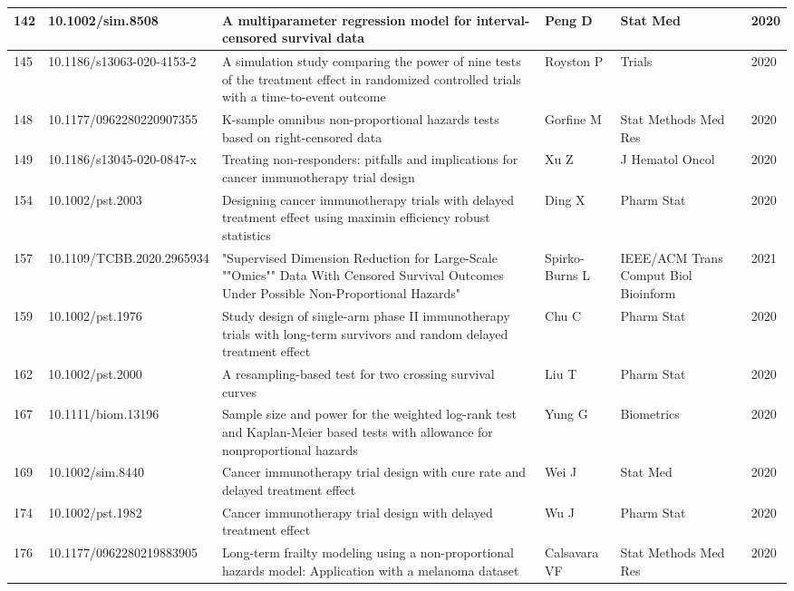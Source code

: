 \begin{landscape}
\begin{longtable}{|p{0.3in}|p{1.8in}|p{2.4in}|p{0.68in}|p{0.89in}|p{0.3in}|}
142 & 10.1002/sim.8508        & A multiparameter regression model for interval-censored survival data & Peng D & Stat Med & 2020 \\ \hline 
145 & 10.1186/s13063-020-4153-2        & A simulation study comparing the power of nine tests of the treatment effect in randomized controlled trials with a time-to-event outcome & Royston P & Trials & 2020 \\ \hline 
148 & 10.1177/0962280220907355        & K-sample omnibus non-proportional hazards tests based on right-censored data & Gorfine M & Stat Methods Med Res & 2020 \\ \hline 
149 & 10.1186/s13045-020-0847-x        & Treating non-responders: pitfalls and implications for cancer immunotherapy trial design & Xu Z & J Hematol Oncol & 2020 \\ \hline 
154 & 10.1002/pst.2003       & Designing cancer immunotherapy trials with delayed treatment effect using maximin efficiency robust statistics & Ding X & Pharm Stat & 2020 \\ \hline 
157 & 10.1109/TCBB.2020.2965934       & "Supervised Dimension Reduction for Large-Scale ""Omics"" Data With Censored Survival Outcomes Under Possible Non-Proportional Hazards" & Spirko-Burns L & IEEE/ACM Trans Comput Biol Bioinform & 2021 \\ \hline 
159 & 10.1002/pst.1976       & Study design of single-arm phase II immunotherapy trials with long-term survivors and random delayed treatment effect & Chu C & Pharm Stat & 2020 \\ \hline 
162 & 10.1002/pst.2000       & A resampling-based test for two crossing survival curves & Liu T & Pharm Stat & 2020 \\ \hline 
167 & 10.1111/biom.13196       & Sample size and power for the weighted log-rank test and Kaplan-Meier based tests with allowance for nonproportional hazards & Yung G & Biometrics & 2020 \\ \hline 
169 & 10.1002/sim.8440       & Cancer immunotherapy trial design with cure rate and delayed treatment effect & Wei J & Stat Med & 2020 \\ \hline 
174 & 10.1002/pst.1982       & Cancer immunotherapy trial design with delayed treatment effect & Wu J & Pharm Stat & 2020 \\ \hline 
176 & 10.1177/0962280219883905      & Long-term frailty modeling using a non-proportional hazards model: Application with a melanoma dataset & Calsavara VF & Stat Methods Med Res & 2020 \\ \hline 

\end{longtable}
\end{landscape}
